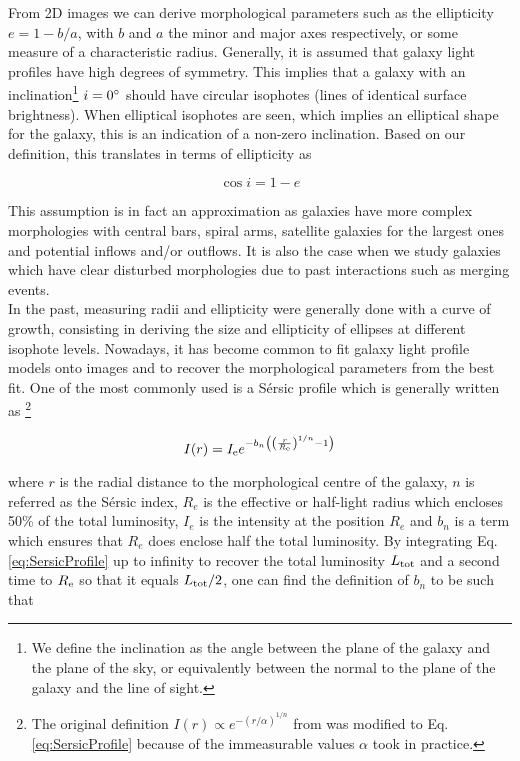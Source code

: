 From 2D images we can derive morphological parameters such as the ellipticity $e = 1 - b/a$, with $b$ and $a$ the minor and major axes respectively, or some measure of a characteristic radius. Generally, it is assumed that galaxy light profiles have high degrees of symmetry. This implies that a galaxy with an inclination\footnote{We define the inclination as the angle between the plane of the galaxy and the plane of the sky, or equivalently between the normal to the plane of the galaxy and the line of sight.} $i = 0 \degree$ should have circular isophotes (lines of identical surface brightness). When elliptical isophotes are seen, which implies an elliptical shape for the galaxy, this is an indication of a non-zero inclination. Based on our definition, this translates in terms of ellipticity as

\begin{equation}
	\cos i = 1 - e
	\label{eq:inclinaison}
\end{equation}

This assumption is in fact an approximation as galaxies have more complex morphologies with central bars, spiral arms, satellite galaxies for the largest ones and potential inflows and/or outflows. It is also the case when we study galaxies which have clear disturbed morphologies due to past interactions such as merging events.  \\

In the past, measuring radii and ellipticity were generally done with a curve of growth, consisting in deriving the size and ellipticity of ellipses at different isophote levels. Nowadays, it has become common to fit galaxy light profile models onto images and to recover the morphological parameters from the best fit. One of the most commonly used is a Sérsic profile which is generally written as \footnote{The original definition $I(r) \propto e^{-(r/\alpha)^{1/n}}$ from  was modified to Eq.\,\ref{eq:SersicProfile} because of the immeasurable values $\alpha$ took in practice.} 

\begin{equation}
    \label{eq:SersicProfile}
    I(r) = I_{\rm{e}} e^{ - b_n \left ( \left  ( \frac{r}{R_{\rm{e}}}  \right )^{1/n} - 1 \right ) }
\end{equation}

where $r$ is the radial distance to the morphological centre of the galaxy, $n$ is referred as the Sérsic index, $R_e$ is the effective or half-light radius which encloses 50\% of the total luminosity, $I_e$ is the intensity at the position $R_e$ and $b_n$ is a term which ensures that $R_e$ does enclose half the total luminosity. By integrating Eq.\,\ref{eq:SersicProfile} up to infinity to recover the total luminosity $L_{\rm{tot}}$ and a second time to $R_{\rm{e}}$ so that it equals $L_{\rm{tot}}/2$, one can find the definition of $b_n$ to be such that 

